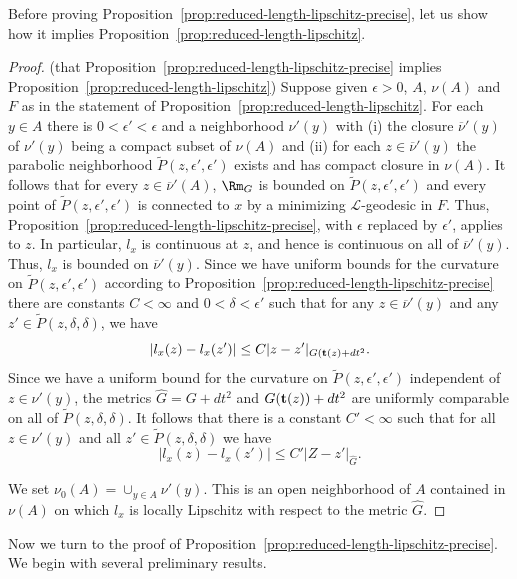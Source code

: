 Before proving Proposition~\ref{prop:reduced-length-lipschitz-precise}, let us show how it implies
Proposition~\ref{prop:reduced-length-lipschitz}.

\begin{proof} (that Proposition~\ref{prop:reduced-length-lipschitz-precise} implies
Proposition~\ref{prop:reduced-length-lipschitz})
Suppose given $\epsilon>0$, $A$, $\nu(A)$ and $F$ as in
the statement of Proposition~\ref{prop:reduced-length-lipschitz}. For each $y\in A$ there is
$0<\epsilon'<\epsilon$ and a neighborhood $\nu'(y)$ with (i) the closure
$\overline{\nu}'(y)$ of $\nu'(y)$ being a compact subset of $\nu(A)$ and (ii)
for each $z\in \overline{\nu}'(y)$ the parabolic neighborhood $\widetilde
P(z,\epsilon',\epsilon')$ exists and has compact closure in $\nu(A)$. It
follows that for every $z\in \overline{\nu}'(A)$, $\Rm_G$ is bounded on
$\widetilde P(z,\epsilon',\epsilon')$ and every point of $\widetilde
P(z,\epsilon',\epsilon')$ is connected to $x$ by a minimizing ${\mathcal
L}$-geodesic in $F$. Thus, Proposition~\ref{prop:reduced-length-lipschitz-precise}, with $\epsilon$ replaced
by $\epsilon'$, applies to $z$. In particular, $l_x$ is continuous at $z$, and
hence is continuous on all of $\overline{\nu}'(y)$. Thus, $l_x$ is bounded on
$\overline{\nu}'(y)$. Since we have uniform bounds for the curvature on
$\widetilde P(z,\epsilon',\epsilon')$ according to Proposition~\ref{prop:reduced-length-lipschitz-precise}
there are constants $C<\infty$ and $0<\delta<\epsilon'$ such that for any $z\in
\overline{\nu}'(y)$ and any $z'\in \widetilde P(z,\delta,\delta)$, we have
$$|l_x(z)-l_x(z')|\le C|z-z'|_{G({\bf t}(z)+dt^2}.$$
Since we have a uniform bound for the curvature on $\widetilde
P(z,\epsilon',\epsilon')$ independent of $z\in \nu'(y)$, the metrics $\widehat
G=G+dt^2$ and $G({\bf t}(z))+dt^2$ are uniformly comparable on all of
$\widetilde P(z,\delta,\delta)$. It follows that there is a constant
$C'<\infty$ such that for all $z\in \nu'(y)$ and all $z'\in \widetilde
P(z,\delta,\delta)$ we have
$$|l_x(z)-l_x(z')|\le C'|Z-z'|_{\widehat G}.$$

We set $\nu_0(A)=\cup_{y\in A}\nu'(y)$. This is an open neighborhood of $A$
contained in $\nu(A)$ on which $l_x$ is locally Lipschitz with respect to the
metric $\widehat G$.
\end{proof}



Now we turn to the proof of Proposition~\ref{prop:reduced-length-lipschitz-precise}. We begin with
several preliminary results.



